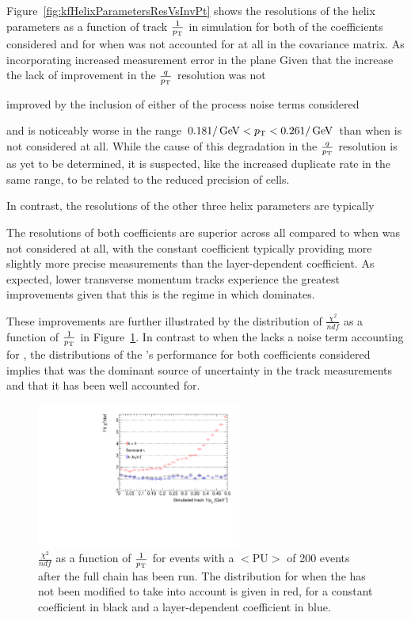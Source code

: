 Figure~\ref{fig:kfHelixParametersResVsInvPt} shows the resolutions of the helix parameters as a function of track $\frac{1}{p_{\mathrm{T}}}$ in simulation for both of the \MS coefficients considered and for when \MS was not accounted for at all in the \KF covariance matrix.
As incorporating \MS increased measurement error in the \rphi plane
Given that the increase the lack of improvement in the $\frac{q}{p_{\mathrm{T}}}$ resolution was not 

improved by the inclusion of either of the \MS process noise terms considered 

and is noticeably worse in the range $0.18 1/\,\text{Ge\hspace{-.08em}V} < p_{\mathrm{T}} < 0.26 1/\,\text{Ge\hspace{-.08em}V}$ than when \MS is not considered at all.
While the cause of this degradation in the $\frac{q}{p_{\mathrm{T}}}$ resolution is as yet to be determined, it is suspected, like the increased duplicate rate in the same \pT range, to be related to the reduced precision of \HT cells.

In contrast, the resolutions of the other three helix parameters are typically 

%
The resolutions of both \MS coefficients are superior across all \pt compared to when \MS was not considered at all, with the constant \MS coefficient typically providing more slightly more precise measurements than the layer-dependent coefficient.  
As expected, lower transverse momentum tracks experience the greatest improvements given that this is the regime in which \MS dominates.
%

These improvements are further illustrated by the distribution of $\frac{\chi^{2}}{ndf}$ as a function of $\frac{1}{p_{\mathrm{T}}}$ in Figure~\ref{fig:2GeVTiltChi2Ndf}.
In contrast to when the \KF lacks a noise term accounting for \MS, the distributions of the \KF's performance for both \MS coefficients considered implies that \MS was the dominant source of uncertainty in the track measurements and that it has been well accounted for.

\begin{figure}[htb]
\centering
\includegraphics[width=0.6\textwidth]{figs/tk-upgrade/results-lowPtTracking/kfChi2NdfVsInvPtTiltedGeometry_5000.pdf}
\caption{ $\frac{\chi^{2}}{ndf}$ as a function of $\frac{1}{p_{\mathrm{T}}}$ for \ttbar events with a $<\textrm{PU}>$ of 200 events after the full chain has been run. The distribution for when the \KF has not been modified to take \MS into account is given in red, for a constant \MS coefficient in black and a layer-dependent \MS coefficient in blue.
}
\label{fig:2GeVTiltChi2Ndf}	
\end{figure}


